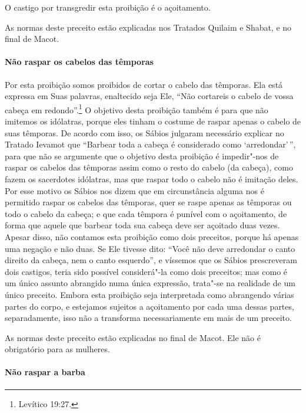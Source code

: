 \begin{multicols}{2}
O castigo por transgredir esta proibição é o açoitamento.

As normas deste preceito estão explicadas nos Tratados Quilaim e Shabat,
e no final de Macot\starr.

\paragraph{Não raspar os cabelos das têmporas}

Por esta proibição somos proibidos de cortar o cabelo das têmporas. Ela
está expressa em Suas palavras, enaltecido seja Ele, ``Não cortareis o
cabelo de vossa cabeça em redondo''.\footnote{Levítico 19:27.} O objetivo desta
proibição também é para que não imitemos os idólatras, porque eles
tinham o costume de raspar apenas o cabelo de suas têmporas. De acordo
com isso, os Sábios julgaram necessário explicar no Tratado Ievamot\starr{} que
``Barbear toda a cabeça é considerado como `arredondar'\,'', para que não
se argumente que o objetivo desta proibição é impedir"-nos de raspar os
cabelos das têmporas assim como o resto do cabelo (da cabeça), como
fazem os sacerdotes idólatras, mas que raspar todo o cabelo não é
imitação deles. Por esse motivo os Sábios nos dizem que em circunstância
alguma nos é permitido raspar os cabelos das têmporas, quer se raspe
apenas as têmporas ou todo o cabelo da cabeça; e que cada têmpora é
punível com o açoitamento, de forma que aquele que barbear toda sua
cabeça deve ser açoitado duas vezes. Apesar disso, não contamos esta
proibição como dois preceitos, porque há apenas uma negação e não duas.
Se Ele tivesse dito: ``Você não deve arredondar o canto direito da
cabeça, nem o canto esquerdo'', e víssemos que os Sábios prescreveram
dois castigos, teria sido possível considerá"-la como dois preceitos; mas
como é um único assunto abrangido numa única expressão, trata"-se na
realidade de um único preceito. Embora esta proibição seja interpretada
como abrangendo várias partes do corpo, e estejamos sujeitos a
açoitamento por cada uma dessas partes, separadamente, isso não a
transforma necessariamente em mais de um preceito.

As normas deste preceito estão explicadas no final de Macot\starr. Ele não é
obrigatório para as mulheres.

\paragraph{Não raspar a barba}


\end{multicols}

